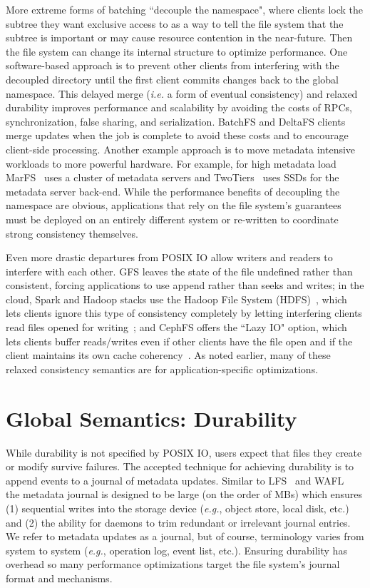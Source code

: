 More extreme forms of batching ``decouple the namespace", where clients lock
the subtree they want exclusive access to as a way to tell the file system that
the subtree is important or may cause resource contention in the near-future.
Then the file system can change its internal structure to optimize performance.
One software-based approach is to prevent other clients from interfering with
the decoupled directory until the first client commits changes back to the
global namespace. This delayed merge ({\it i.e.} a form of eventual
consistency) and relaxed durability improves performance and scalability by
avoiding the costs of RPCs, synchronization, false sharing, and serialization.
BatchFS and DeltaFS clients merge updates when the job is complete to avoid
these costs and to encourage client-side processing. Another example approach
is to move metadata intensive workloads to more powerful hardware. For example,
for high metadata load MarFS~\cite{grider:pdsw2015-marfs} uses a cluster of
metadata servers and TwoTiers~\cite{bent:slides-twotiers} uses SSDs for the
metadata server back-end.  While the performance benefits of decoupling the
namespace are obvious, applications that rely on the file system's guarantees
must be deployed on an entirely different system or re-written to coordinate
strong consistency themselves.  

Even more drastic departures from POSIX IO allow writers and readers to
interfere with each other. GFS leaves the state of the file undefined rather
than consistent, forcing applications to use append rather than seeks and
writes; in the cloud, Spark and Hadoop stacks use the Hadoop File System
(HDFS)~\cite{shvachko:msst10}, which lets clients ignore this type of
consistency completely by letting interfering clients read files opened for
writing~\cite{hakimzadeh:dais14-hdfs-consistency}; and CephFS offers the ``Lazy
IO" option, which lets clients buffer reads/writes even if other clients have
the file open and if the client maintains its own cache
coherency~\cite{docs:cephcaps}. As noted earlier, many of these relaxed
consistency semantics are for application-specific optimizations.

\section{Global Semantics: Durability}

While durability is not specified by POSIX IO, users expect that files they
create or modify survive failures. The accepted technique for achieving
durability is to append events to a journal of metadata updates.  Similar to
LFS~\cite{rosenblum:acm1992-LFS} and WAFL~\cite{hitz:wtec1994-WAFL} the
metadata journal is designed to be large (on the order of MBs) which ensures
(1) sequential writes into the storage device ({\it e.g.}, object store, local
disk, etc.) and (2) the ability for daemons to trim redundant or irrelevant
journal entries. We refer to metadata updates as a journal, but of course,
terminology varies from system to system ({\it e.g.}, operation log, event
list, etc.). Ensuring durability has overhead so many performance optimizations
target the file system's journal format and mechanisms.


